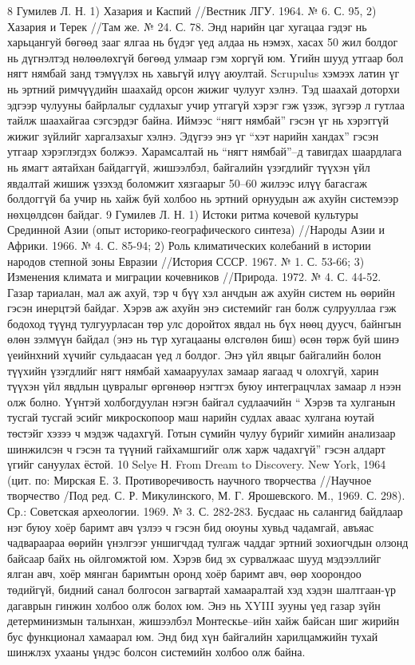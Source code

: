 8 Гумилев Л. Н. 1) Хазария и Каспий //Вестник ЛГУ. 1964. № 6. С. 95, 2) Хазария и Терек //Там же. № 24. С. 78.
Энд нарийн цаг хугацаа гэдэг нь харьцангуй бөгөөд зааг ялгаа нь бүдэг үед алдаа нь нэмэх, хасах 50 жил болдог нь дүгнэлтэд нөлөөлөхгүй бөгөөд улмаар гэм хоргүй юм. Үгийн шууд утгаар бол нягт нямбай занд тэмүүлэх нь хавьгүй илүү аюултай. Scrupulus хэмээх латин үг нь эртний римчүүдийн шаахайд орсон жижиг чулууг хэлнэ. Тэд шаахай доторхи эдгээр чулууны байрлалыг судлахыг учир утгагүй хэрэг гэж үзэж, зүгээр л гутлаа тайлж шаахайгаа сэгсэрдэг байна. Иймээс “нягт нямбай” гэсэн үг нь хэрэггүй жижиг зүйлийг харгалзахыг хэлнэ. Эдүгээ энэ үг “хэт нарийн хандах” гэсэн утгаар хэрэглэгдэх болжээ.
Харамсалтай нь “нягт нямбай”–д тавигдах шаардлага нь ямагт аятайхан байдаггүй, жишээлбэл, байгалийн үзэгдлийг түүхэн үйл явдалтай жишиж үзэхэд боломжит хязгаарыг 50–60 жилээс илүү багасгаж болдоггүй ба учир нь хайж буй холбоо нь эртний орнуудын аж ахуйн системээр нөхцөлдсөн байдаг.
9 Гумилев Л. Н. 1) Истоки ритма кочевой культуры Срединной Азии (опыт историко-географического синтеза) //Народы Азии и Африки. 1966. № 4. С. 85-94; 2) Роль климатических колебаний в истории народов степной зоны Евразии //История СССР. 1967. № 1. С. 53-66; 3) Изменения климата и миграции кочевников //Природа. 1972. № 4. С. 44-52.
Газар тариалан, мал аж ахуй, тэр ч бүү хэл анчдын аж ахуйн систем нь өөрийн гэсэн инерцтэй байдаг. Хэрэв аж ахуйн энэ системийг ган болж сулрууллаа гэж бодоход түүнд тулгуурласан төр улс доройтох явдал нь бүх нөөц дуусч, байнгын өлөн зэлмүүн байдал (энэ нь түр хугацааны өлсгөлөн биш) өсөн төрж буй шинэ үеийнхний хүчийг сульдаасан үед л болдог. Энэ үйл явцыг байгалийн болон түүхийн үзэгдлийг нягт нямбай хамааруулах замаар яагаад ч олохгүй, харин түүхэн үйл явдлын цувралыг өргөнөөр нэгтгэх буюу интеграцчлах замаар л нээн олж болно. Үүнтэй холбогдуулан нэгэн байгал судлаачийн “ Хэрэв та хулганын тусгай тусгай эсийг микроскопоор маш нарийн судлах аваас хулгана юутай төстэйг хэзээ ч мэдэж чадахгүй. Готын сүмийн чулуу бүрийг химийн анализаар шинжилсэн ч гэсэн та түүний гайхамшгийг олж харж чадахгүй” гэсэн алдарт үгийг сануулах ёстой.
10 Selye Н. From Dream to Discovery. New York, 1964 (цит. по: Мирская Е. 3. Противоречивость научного творчества //Научное творчество /Под ред. С. Р. Микулинского, М. Г. Ярошевского. М., 1969. С. 298). Ср.: Советская археологии. 1969. № 3. С. 282-283.
Бусдаас нь салангид байдлаар нэг буюу хоёр баримт авч үзлээ ч гэсэн бид оюуны хувьд чадамгай, авъяас чадвараараа өөрийн үнэлгээг уншигчдад тулгаж чаддаг эртний зохиогчдын олзонд байсаар байх нь ойлгомжтой юм. Хэрэв бид эх сурвалжаас шууд мэдээллийг ялган авч, хоёр мянган баримтын оронд хоёр баримт авч, өөр хоорондоо төдийгүй, бидний санал болгосон загвартай хамааралтай хэд хэдэн шалтгаан-үр дагаврын гинжин холбоо олж болох юм. Энэ нь XYIII зууны үед газар зүйн детерминизмын талынхан, жишээлбэл Монтескье–ийн хайж байсан шиг жирийн бус функционал хамаарал юм. Энд бид хүн байгалийн харилцамжийн тухай шинжлэх ухааны үндэс болсон системийн холбоо олж байна.
